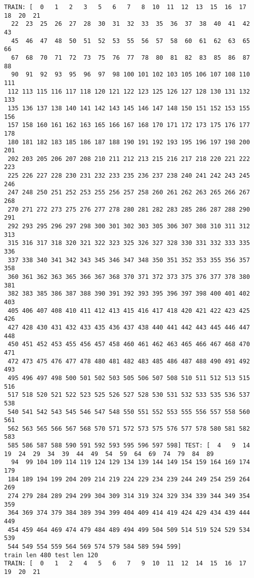 \documentclass[11pt]{article}
\begin{document}
    \begin{Verbatim}[commandchars=\\\{\}]
TRAIN: [  0   1   2   3   5   6   7   8  10  11  12  13  15  16  17  18  20  21
  22  23  25  26  27  28  30  31  32  33  35  36  37  38  40  41  42  43
  45  46  47  48  50  51  52  53  55  56  57  58  60  61  62  63  65  66
  67  68  70  71  72  73  75  76  77  78  80  81  82  83  85  86  87  88
  90  91  92  93  95  96  97  98 100 101 102 103 105 106 107 108 110 111
 112 113 115 116 117 118 120 121 122 123 125 126 127 128 130 131 132 133
 135 136 137 138 140 141 142 143 145 146 147 148 150 151 152 153 155 156
 157 158 160 161 162 163 165 166 167 168 170 171 172 173 175 176 177 178
 180 181 182 183 185 186 187 188 190 191 192 193 195 196 197 198 200 201
 202 203 205 206 207 208 210 211 212 213 215 216 217 218 220 221 222 223
 225 226 227 228 230 231 232 233 235 236 237 238 240 241 242 243 245 246
 247 248 250 251 252 253 255 256 257 258 260 261 262 263 265 266 267 268
 270 271 272 273 275 276 277 278 280 281 282 283 285 286 287 288 290 291
 292 293 295 296 297 298 300 301 302 303 305 306 307 308 310 311 312 313
 315 316 317 318 320 321 322 323 325 326 327 328 330 331 332 333 335 336
 337 338 340 341 342 343 345 346 347 348 350 351 352 353 355 356 357 358
 360 361 362 363 365 366 367 368 370 371 372 373 375 376 377 378 380 381
 382 383 385 386 387 388 390 391 392 393 395 396 397 398 400 401 402 403
 405 406 407 408 410 411 412 413 415 416 417 418 420 421 422 423 425 426
 427 428 430 431 432 433 435 436 437 438 440 441 442 443 445 446 447 448
 450 451 452 453 455 456 457 458 460 461 462 463 465 466 467 468 470 471
 472 473 475 476 477 478 480 481 482 483 485 486 487 488 490 491 492 493
 495 496 497 498 500 501 502 503 505 506 507 508 510 511 512 513 515 516
 517 518 520 521 522 523 525 526 527 528 530 531 532 533 535 536 537 538
 540 541 542 543 545 546 547 548 550 551 552 553 555 556 557 558 560 561
 562 563 565 566 567 568 570 571 572 573 575 576 577 578 580 581 582 583
 585 586 587 588 590 591 592 593 595 596 597 598] TEST: [  4   9  14  19  24  29  34  39  44  49  54  59  64  69  74  79  84  89
  94  99 104 109 114 119 124 129 134 139 144 149 154 159 164 169 174 179
 184 189 194 199 204 209 214 219 224 229 234 239 244 249 254 259 264 269
 274 279 284 289 294 299 304 309 314 319 324 329 334 339 344 349 354 359
 364 369 374 379 384 389 394 399 404 409 414 419 424 429 434 439 444 449
 454 459 464 469 474 479 484 489 494 499 504 509 514 519 524 529 534 539
 544 549 554 559 564 569 574 579 584 589 594 599]
train len 480 test len 120
TRAIN: [  0   1   2   4   5   6   7   9  10  11  12  14  15  16  17  19  20  21

\end{Verbatim}
\end{document}
